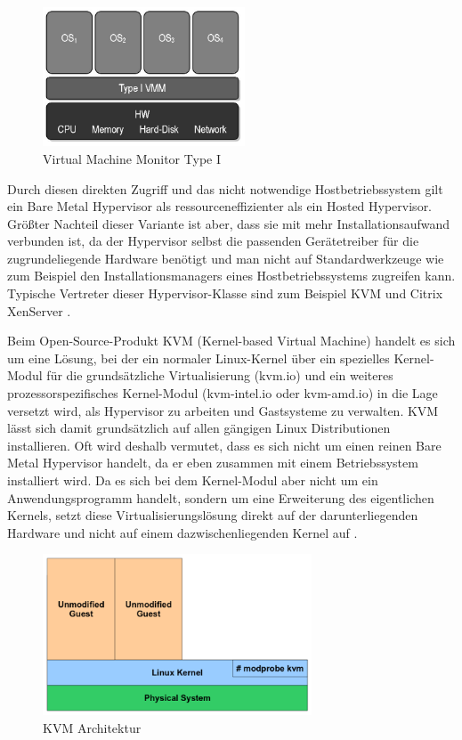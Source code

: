 \begin{figure}[!ht]
  \begin{center}
    \includegraphics[width=6cm]{bilder/VMM-Type1.jpg}
    \caption{Virtual Machine Monitor Type I \citep{wiki:002}}
  \end{center}
\end{figure}

Durch diesen direkten Zugriff und das nicht notwendige Hostbetriebssystem gilt ein Bare Metal Hypervisor als ressourceneffizienter als ein Hosted Hypervisor. Größter Nachteil dieser Variante ist aber, dass sie mit mehr Installationsaufwand verbunden ist, da der Hypervisor selbst die passenden Gerätetreiber für die zugrundeliegende Hardware benötigt und man nicht auf Standardwerkzeuge wie zum Beispiel den Installationsmanagers eines Hostbetriebssystems zugreifen kann. Typische Vertreter dieser Hypervisor-Klasse sind zum Beispiel KVM und Citrix XenServer  \citep{wiki:004}.

Beim Open-Source-Produkt KVM (Kernel-based Virtual Machine) handelt es sich um eine Lösung, bei der ein normaler Linux-Kernel über ein spezielles Kernel-Modul für die grundsätzliche Virtualisierung (kvm.io) und ein weiteres prozessorspezifisches Kernel-Modul (kvm-intel.io oder kvm-amd.io) in die Lage versetzt wird, als Hypervisor zu arbeiten und Gastsysteme zu verwalten. KVM lässt sich damit grundsätzlich auf allen gängigen Linux Distributionen installieren. Oft wird deshalb vermutet, dass es sich nicht um einen reinen Bare Metal Hypervisor handelt, da er eben zusammen mit einem Betriebssystem installiert wird. Da es sich bei dem Kernel-Modul aber nicht um ein Anwendungsprogramm handelt, sondern um eine Erweiterung des eigentlichen Kernels, setzt diese Virtualisierungslösung direkt auf der darunterliegenden Hardware und nicht auf einem dazwischenliegenden Kernel auf \citep[Vgl.][]{kvm:001}.

\begin{figure}[!ht]
  \begin{center}
    \includegraphics[width=8cm]{bilder/kvm.png}
    \caption{KVM Architektur \citep{kvm:002}}
  \end{center}
\end{figure}

